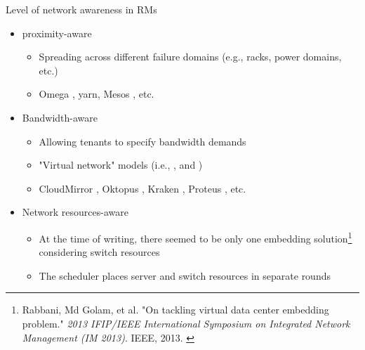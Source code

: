 \begin{frame}{Level of network awareness in RMs}
  \vspace{2mm}
  \begin{itemize}
    \item {} proximity-aware
    \begin{itemize}
      \item Spreading  across different failure domains (e.g., racks, power domains, etc.)
      \item Omega \cite{omega}, \glsdesc{yarn}, Mesos \cite{mesos}, etc.
    \end{itemize}
    \item Bandwidth-aware
    \begin{itemize}
      \item Allowing tenants to specify bandwidth demands
      \item "Virtual network" models (i.e., ,  and )
      \item CloudMirror \cite{cloudmirror}, Oktopus \cite{oktopus}, Kraken \cite{kraken}, Proteus \cite{proteus}, etc.
    \end{itemize}
    \item Network resources-aware
    \begin{itemize}
      \item At the time of writing, there seemed to be only one embedding solution\footnote{\tiny{Rabbani, Md Golam, et al. "On tackling virtual data center embedding problem." \textit{2013 IFIP/IEEE International Symposium on Integrated Network Management (IM 2013)}. IEEE, 2013. \cite{ontackling}}} considering switch resources
      \item The scheduler places server and switch resources in separate rounds
    \end{itemize}
  \end{itemize}
  \vspace{5mm}
\end{frame}


